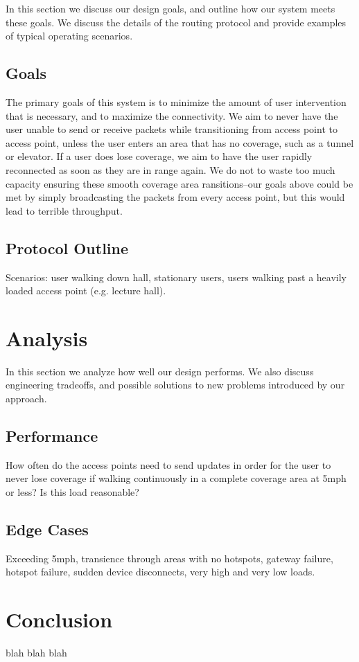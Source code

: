 \documentclass[letterpaper,10pt]{article}
\begin{document}
In this section we discuss our design goals, and outline how our system
meets these goals. We discuss the details of the routing protocol and provide 
examples of typical operating scenarios.

\subsection{Goals}
The primary goals of this system is to minimize the amount of user 
intervention that is necessary, and to maximize the connectivity.
We aim to never have the user unable to send or receive packets while 
transitioning from access point to access point, unless the user enters an area
that has no coverage, such as a tunnel or elevator. If a user does lose coverage,
we aim to have the user rapidly reconnected as soon as they are in range again.
We do not to waste too much capacity ensuring these smooth coverage area 
ransitions--our goals above could be met by simply broadcasting the packets
from every access point, but this would lead to terrible throughput.

\subsection{Protocol Outline}

Scenarios: user walking down hall, stationary users, users walking past
a heavily loaded access point (e.g. lecture hall).

\section{Analysis}

In this section we analyze how well our design performs. We also discuss 
engineering tradeoffs, and possible solutions to new problems introduced by 
our approach.

\subsection{Performance}
How often do the access points need to send updates in order for the
user to never lose coverage if walking continuously in a complete coverage 
area at 5mph or less? Is this load reasonable?

\subsection{Edge Cases}
Exceeding 5mph, transience through areas with no hotspots, gateway failure, 
hotspot failure, sudden device disconnects, very high and very low loads.

\section{Conclusion}
blah blah blah

{\footnotesize 
}
\end{document}
